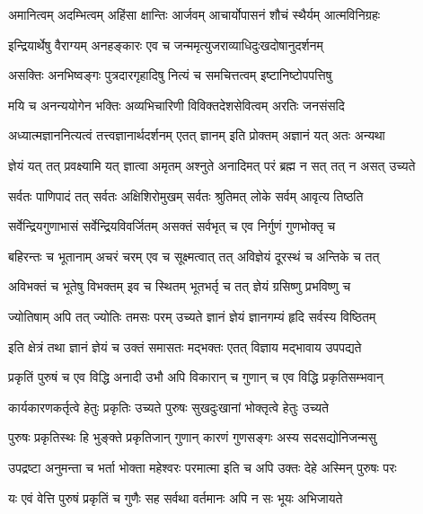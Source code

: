 \twolineshloka
{अमानित्वम् अदम्भित्वम् अहिंसा क्षान्तिः आर्जवम्}
{आचार्योपासनं शौचं स्थैर्यम् आत्मविनिग्रहः}%

\twolineshloka
{इन्द्रियार्थेषु वैराग्यम् अनहङ्कारः एव च}
{जन्ममृत्युजराव्याधिदुःखदोषानुदर्शनम्}%

\twolineshloka
{असक्तिः अनभिष्वङ्गः पुत्रदारगृहादिषु}
{नित्यं च समचित्तत्वम् इष्टानिष्टोपपत्तिषु}%

\twolineshloka
{मयि च अनन्ययोगेन भक्तिः अव्यभिचारिणी}
{विविक्तदेशसेवित्वम् अरतिः जनसंसदि}%

\twolineshloka
{अध्यात्मज्ञाननित्यत्वं तत्त्वज्ञानार्थदर्शनम्}
{एतत् ज्ञानम् इति प्रोक्तम् अज्ञानं यत् अतः अन्यथा}%

\twolineshloka
{ज्ञेयं यत् तत् प्रवक्ष्यामि यत् ज्ञात्वा अमृतम् अश्नुते}
{अनादिमत् परं ब्रह्म न सत् तत् न असत् उच्यते}%

\twolineshloka
{सर्वतः पाणिपादं तत् सर्वतः अक्षिशिरोमुखम्}
{सर्वतः श्रुतिमत् लोके सर्वम् आवृत्य तिष्ठति}%

\twolineshloka
{सर्वेन्द्रियगुणाभासं सर्वेन्द्रियविवर्जितम्}
{असक्तं सर्वभृत् च एव निर्गुणं गुणभोक्तृ च}%

\twolineshloka
{बहिरन्तः च भूतानाम् अचरं चरम् एव च}
{सूक्ष्मत्वात् तत् अविज्ञेयं दूरस्थं च अन्तिके च तत्}%

\twolineshloka
{अविभक्तं च भूतेषु विभक्तम् इव च स्थितम्}
{भूतभर्तृ च तत् ज्ञेयं ग्रसिष्णु प्रभविष्णु च}%

\twolineshloka
{ज्योतिषाम् अपि तत् ज्योतिः तमसः परम् उच्यते}
{ज्ञानं ज्ञेयं ज्ञानगम्यं हृदि सर्वस्य विष्ठितम्}%

\twolineshloka
{इति क्षेत्रं तथा ज्ञानं ज्ञेयं च उक्तं समासतः}
{मद्भक्तः एतत् विज्ञाय मद्भावाय उपपद्यते}%

\twolineshloka
{प्रकृतिं पुरुषं च एव विद्धि अनादी उभौ अपि}
{विकारान् च गुणान् च एव विद्धि प्रकृतिसम्भवान्}%

\twolineshloka
{कार्यकारणकर्तृत्वे हेतुः प्रकृतिः उच्यते}
{पुरुषः सुखदुःखानां भोक्तृत्वे हेतुः उच्यते}%

\twolineshloka
{पुरुषः प्रकृतिस्थः हि भुङ्क्ते प्रकृतिजान् गुणान्}
{कारणं गुणसङ्गः अस्य सदसद्योनिजन्मसु}%

\twolineshloka
{उपद्रष्टा अनुमन्ता च भर्ता भोक्ता महेश्वरः}
{परमात्मा इति च अपि उक्तः देहे अस्मिन् पुरुषः परः}%

\twolineshloka
{यः एवं वेत्ति पुरुषं प्रकृतिं च गुणैः सह}
{सर्वथा वर्तमानः अपि न सः भूयः अभिजायते}%

